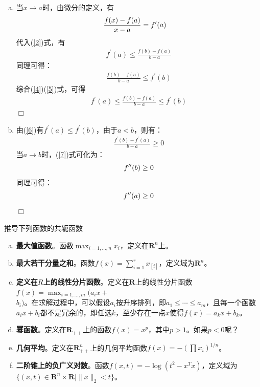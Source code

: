 \documentclass[10pt, a4paper]{article}
\begin{document}
\begin{enumerate}[(a)]
	\item 当$x\to a$时，由微分的定义，有
    \begin{align}
        \frac{f(x)-f(a)}{x-a} & = f^{\prime}(a) \notag
    \end{align}
    代入(\ref*{2})式，有
    \begin{align}
        f^{\prime}(a) \leq \frac{f(b)-f(a)}{b-a}    \label{4}
    \end{align}
    同理可得：
    \begin{align}
        \frac{f(b)-f(a)}{b-a} \leq f^{\prime}(b)    \label{5}
    \end{align}
    综合(\ref*{4})(\ref*{5})式，可得
    \begin{align}
        f^{\prime}(a) \leq \frac{f(b)-f(a)}{b-a} \leq f^{\prime}(b) \label{6}
    \end{align}
    \hfill $\Box$

	\item 由(\ref*{6})有$f^{\prime}(a) \leq f^{\prime}(b)$，由于$a<b$，则有：
    \begin{align}
        \frac{f^{\prime}(b)-f^{\prime}(a)}{b-a} \geq 0  \label{7}
    \end{align}
    当$a\to b$时，(\ref*{7})式可化为：
    \begin{align}
        f^{\prime \prime}(b) \geq 0 \notag
    \end{align}
    同理可得：
    \begin{align}
        f^{\prime \prime}(a) \geq 0 \notag
    \end{align}
    \hfill $\Box$
\end{enumerate}
\vspace*{3em}
\begin{Problem}
推导下列函数的共轭函数
\begin{enumerate}[(a)]
	\item \textbf{最大值函数}。函数$\max_{i=1,\dots ,n} x_{i} $，定义在$\mathbf{R}^{n} $上。
	\item \textbf{最大若干分量之和}。函数$f(x)=\sum_{i=1}^{r} x_{[i]}$，定义域为$\mathbf{R}^{n} $。
	\item \textbf{定义在$R$上的线性分片函数}。定义在$\mathbf{R}$上的线性分片函数$f(x)=\max _{i=1, \ldots, m}(a_{i} x+$\\$b_{i})$。在求解过程中，可以假设$a_{i} $按升序排列，即$a_{1} \leq \cdots \leq a_{m}$，且每一个函数$a_{i} x+b_{i}$都不是冗余的，即任选$k$，至少存在一点$x$使得$f(x)=a_{k}x+b_{k}  $。
	\item \textbf{幂函数}。定义在$\mathbf{R}_{++} $上的函数$f(x)=x^{p} $，其中$p>1$。如果$p<0$呢？
    \item \textbf{几何平均}。定义在$\mathbf{R}_{++}^{n} $上的几何平均函数$f(x)=-\left(\prod x_{i}\right)^{1 / n}$。
    \item \textbf{二阶锥上的负广义对数}。函数$f(x, t)=-\log \left(t^{2}-x^{T} x\right)$，定义域为$\{(x, t) \in \mathbf{R}^{n} \times \mathbf{R} \mid\|x\|_{2}<t\}$。
\end{enumerate}
\end{Problem}
\end{document}
